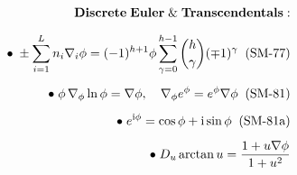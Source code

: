 \documentclass[preview]{standalone}
\begin{document}
\begin{align*}
\special{dvisvgm:raw <g id='unique000'>}\mathbf{Discrete\;Euler\;\&\;Transcendentals:}\\[6pt]\bullet\;\pm\sum_{i=1}^L n_i\nabla_i\phi = (-1)^{h+1}\phi\sum_{\gamma=0}^{h-1}\binom{h}{\gamma}(\mp 1)^\gamma\;\;(\text{SM-77})\\[5pt]\bullet\;\phi\,\nabla_\phi\ln\phi = \nabla\phi, \quad \nabla_\phi e^\phi = e^\phi\nabla\phi\;\;(\text{SM-81})\\[5pt]\bullet\;e^{\mathrm{i}\phi} = \cos\phi + \mathrm{i}\sin\phi\;\;(\text{SM-81a})\\[5pt]\bullet\;D_u\arctan u = \frac{1 + u\nabla\phi}{1 + u^2}\special{dvisvgm:raw </g>}
\end{align*}
\end{document}
